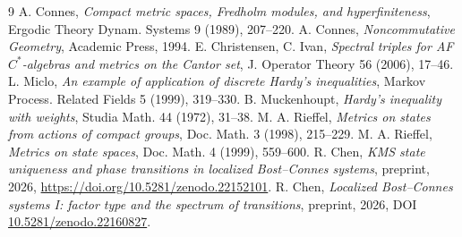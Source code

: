 \documentclass[11pt]{amsart}
\numberwithin{equation}{section}
\theoremstyle{definition}
\theoremstyle{remark}
\begin{document}
\begin{thebibliography}{9}
 A. Connes, \emph{Compact metric spaces, Fredholm modules, and hyperfiniteness}, Ergodic Theory Dynam. Systems 9 (1989), 207--220.
 A. Connes, \emph{Noncommutative Geometry}, Academic Press, 1994.
 E. Christensen, C. Ivan, \emph{Spectral triples for AF $C^*$-algebras and metrics on the Cantor set}, J. Operator Theory 56 (2006), 17--46.
 L. Miclo, \emph{An example of application of discrete Hardy's inequalities}, Markov Process. Related Fields 5 (1999), 319--330.
 B. Muckenhoupt, \emph{Hardy's inequality with weights}, Studia Math. 44 (1972), 31--38.
 M. A. Rieffel, \emph{Metrics on states from actions of compact groups}, Doc. Math. 3 (1998), 215--229.
 M. A. Rieffel, \emph{Metrics on state spaces}, Doc. Math. 4 (1999), 559--600.
 R. Chen, \emph{KMS state uniqueness and phase transitions in localized Bost--Connes systems}, preprint, 2026, \newline\url{https://doi.org/10.5281/zenodo.22152101}.
 R. Chen, \emph{Localized Bost--Connes systems I: factor type and the spectrum of transitions}, preprint, 2026, DOI \href{https://doi.org/10.5281/zenodo.22160827}{10.5281/zenodo.22160827}.
\end{thebibliography}
\end{document}
